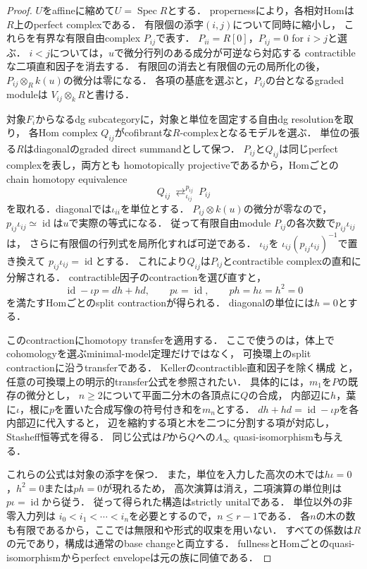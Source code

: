 \documentclass[11pt,a4paper]{ltjsarticle}
\theoremstyle{definition}
\newcommand{\id}{\operatorname{id}}
\begin{document}
\begin{proof}
$U$をaffineに縮めて$U=\operatorname{Spec}R$とする．
propernessにより，各相対Homは$R$上のperfect complexである．
有限個の添字$(i,j)$について同時に縮小し，
これらを有界な有限自由complex $P_{ij}$で表す．
$P_{ii}=R[0]$，$P_{ij}=0$ for $i>j$と選ぶ．
$i<j$については，$u$で微分行列のある成分が可逆なら対応する
contractibleな二項直和因子を消去する．
有限回の消去と有限個の元の局所化の後，
$P_{ij}\otimes_Rk(u)$の微分は零になる．
各項の基底を選ぶと，$P_{ij}$の台となるgraded moduleは
$V_{ij}\otimes_kR$と書ける．

対象$F_i$からなるdg subcategoryに，対象と単位を固定する自由dg resolutionを取り，
各Hom complex $Q_{ij}$がcofibrantな$R$-complexとなるモデルを選ぶ．
単位の張る$R$はdiagonalのgraded direct summandとして保つ．
$P_{ij}$と$Q_{ij}$は同じperfect complexを表し，両方とも
homotopically projectiveであるから，Homごとのchain homotopy equivalence
\[
 Q_{ij}\ \mathop{\rightleftarrows}^{p_{ij}}_{\iota_{ij}}\ P_{ij}
\]
を取れる．diagonalでは$\iota_{ii}$を単位とする．
$P_{ij}\otimes k(u)$の微分が零なので，
$p_{ij}\iota_{ij}\simeq\id$は$u$で実際の等式になる．
従って有限自由module $P_{ij}$の各次数で$p_{ij}\iota_{ij}$は，
さらに有限個の行列式を局所化すれば可逆である．
$\iota_{ij}$を
$\iota_{ij}(p_{ij}\iota_{ij})^{-1}$で置き換えて
$p_{ij}\iota_{ij}=\id$とする．
これにより$Q_{ij}$は$P_{ij}$とcontractible complexの直和に分解される．
contractible因子のcontractionを選び直すと，
\[
 \id-\iota p=dh+hd,\qquad
 p\iota=\id,\qquad p h=h\iota=h^2=0
\]
を満たすHomごとのsplit contractionが得られる．
diagonalの単位には$h=0$とする．

このcontractionにhomotopy transferを適用する．
ここで使うのは，体上でcohomologyを選ぶminimal-model定理だけではなく，
可換環上のsplit contractionに沿うtransferである．
Kellerのcontractible直和因子を除く構成
\cite[\S8.1]{KellerAinfty}と，
任意の可換環上の明示的transfer公式\cite{MarklTransfer}を参照されたい．
具体的には，$m_1$を$P$の既存の微分とし，
$n\geq2$について平面二分木の各頂点に$Q$の合成，
内部辺に$h$，葉に$\iota$，根に$p$を置いた合成写像の符号付き和を$m_n$とする．
$dh+hd=\id-\iota p$を各内部辺に代入すると，
辺を縮約する項と木を二つに分割する項が対応し，Stasheff恒等式を得る．
同じ公式は$P$から$Q$への$A_\infty$ quasi-isomorphismも与える．

これらの公式は対象の添字を保つ．
また，単位を入力した高次の木では$h\iota=0$，$h^2=0$または$p h=0$が現れるため，
高次演算は消え，二項演算の単位則は$p\iota=\id$から従う．
従って得られた構造はstrictly unitalである．
単位以外の非零入力列は
$i_0<i_1<\cdots<i_n$を必要とするので，$n\leq r-1$である．
各$n$の木の数も有限であるから，ここでは無限和や形式的収束を用いない．
すべての係数は$R$の元であり，構成は通常のbase changeと両立する．
fullnessとHomごとのquasi-isomorphismからperfect envelopeは元の族に同値である．
\end{proof}
\end{document}
